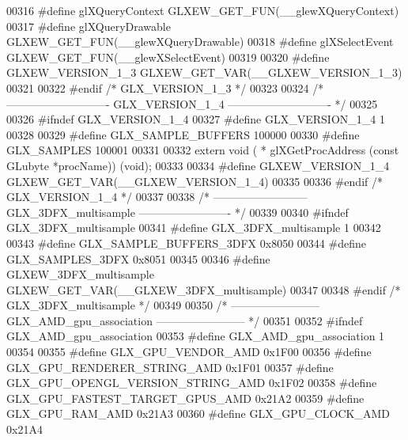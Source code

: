 \begin{DoxyCode}
00316 \textcolor{preprocessor}{#define glXQueryContext GLXEW\_GET\_FUN(\_\_glewXQueryContext)}
00317 \textcolor{preprocessor}{#define glXQueryDrawable GLXEW\_GET\_FUN(\_\_glewXQueryDrawable)}
00318 \textcolor{preprocessor}{#define glXSelectEvent GLXEW\_GET\_FUN(\_\_glewXSelectEvent)}
00319 
00320 \textcolor{preprocessor}{#define GLXEW\_VERSION\_1\_3 GLXEW\_GET\_VAR(\_\_GLXEW\_VERSION\_1\_3)}
00321 
00322 \textcolor{preprocessor}{#endif }\textcolor{comment}{/* GLX\_VERSION\_1\_3 */}\textcolor{preprocessor}{}
00323 
00324 \textcolor{comment}{/* ---------------------------- GLX\_VERSION\_1\_4 ---------------------------- */}
00325 
00326 \textcolor{preprocessor}{#ifndef GLX\_VERSION\_1\_4}
00327 \textcolor{preprocessor}{#define GLX\_VERSION\_1\_4 1}
00328 
00329 \textcolor{preprocessor}{#define GLX\_SAMPLE\_BUFFERS 100000}
00330 \textcolor{preprocessor}{#define GLX\_SAMPLES 100001}
00331 
00332 \textcolor{keyword}{extern} void ( * glXGetProcAddress (\textcolor{keyword}{const} GLubyte *procName)) (void);
00333 
00334 \textcolor{preprocessor}{#define GLXEW\_VERSION\_1\_4 GLXEW\_GET\_VAR(\_\_GLXEW\_VERSION\_1\_4)}
00335 
00336 \textcolor{preprocessor}{#endif }\textcolor{comment}{/* GLX\_VERSION\_1\_4 */}\textcolor{preprocessor}{}
00337 
00338 \textcolor{comment}{/* -------------------------- GLX\_3DFX\_multisample ------------------------- */}
00339 
00340 \textcolor{preprocessor}{#ifndef GLX\_3DFX\_multisample}
00341 \textcolor{preprocessor}{#define GLX\_3DFX\_multisample 1}
00342 
00343 \textcolor{preprocessor}{#define GLX\_SAMPLE\_BUFFERS\_3DFX 0x8050}
00344 \textcolor{preprocessor}{#define GLX\_SAMPLES\_3DFX 0x8051}
00345 
00346 \textcolor{preprocessor}{#define GLXEW\_3DFX\_multisample GLXEW\_GET\_VAR(\_\_GLXEW\_3DFX\_multisample)}
00347 
00348 \textcolor{preprocessor}{#endif }\textcolor{comment}{/* GLX\_3DFX\_multisample */}\textcolor{preprocessor}{}
00349 
00350 \textcolor{comment}{/* ------------------------ GLX\_AMD\_gpu\_association ------------------------ */}
00351 
00352 \textcolor{preprocessor}{#ifndef GLX\_AMD\_gpu\_association}
00353 \textcolor{preprocessor}{#define GLX\_AMD\_gpu\_association 1}
00354 
00355 \textcolor{preprocessor}{#define GLX\_GPU\_VENDOR\_AMD 0x1F00}
00356 \textcolor{preprocessor}{#define GLX\_GPU\_RENDERER\_STRING\_AMD 0x1F01}
00357 \textcolor{preprocessor}{#define GLX\_GPU\_OPENGL\_VERSION\_STRING\_AMD 0x1F02}
00358 \textcolor{preprocessor}{#define GLX\_GPU\_FASTEST\_TARGET\_GPUS\_AMD 0x21A2}
00359 \textcolor{preprocessor}{#define GLX\_GPU\_RAM\_AMD 0x21A3}
00360 \textcolor{preprocessor}{#define GLX\_GPU\_CLOCK\_AMD 0x21A4}

\end{DoxyCode}
